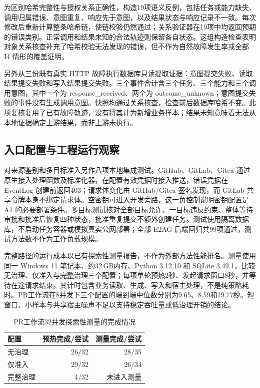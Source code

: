 为区别哈希完整性与授权关系正确性，构造19项语义反例，包括任务或能力缺失、调用归属错误、意图重复、响应先于意图，以及结果状态与响应记录不一致。每次修改后重新计算整条哈希链，使链校验仍然通过；关系验证器在19项中均返回预期的错误类别。正常调用和结果未知的合法轨迹则保留各自状态。这组构造检查表明对象关系核查补充了哈希校验无法发现的错误，但不作为自然故障发生率或全部 I4 情形的覆盖证明。

另外从三份既有真实 HTTP 故障执行数据库只读提取证据：意图提交失败、读取结果提交失败和写入结果提交失败。三个事件合计含三个任务、三个能力和三个调用意图，其中一个为 response\_received、两个为 outcome\_unknown；意图提交失败的事件没有生成调用意图。快照均通过关系核查，检查前后数据库哈希不变。此项复核复用了已有故障轨迹，没有将其计为新增业务样本；结果未知意味着无法从本地证据确定上游结果，而非上游未执行。

\subsection{入口配置与工程运行观察}
\label{sec:engineering-rr022}

对来源鉴别和多目标准入另作八项本地集成测试。GitHub、GitLab、Gitea 通过原生接入处理函数及标准化器，在配置有效凭据时接入推送，错误凭据在 EventLog 创建前返回403；请求体变化由 GitHub/Gitea 签名发现，而 GitLab 共享令牌本身不绑定请求体。空密钥可进入开发旁路，这一负控制说明密钥配置是 A1 的必要部署条件。多目标测试核对全部目标允许、一目标违反约束、整体等待审批和批准后恢复四种状态，批准重复提交不额外创建任务。测试使用隔离数据库，不启动任务容器或模拟真实公网部署；全部 E2AG 后端回归共99项通过，测试方法数不作为工作负载规模。

完整路径的运行成本以已有探索性测量报告，不作为外部方法性能排名。测量使用同一 Windows 11 笔记本、约32\,GB内存、Python 3.12.10 和 SQLite 3.49.1，比较无治理、仅准入与完整治理三个配置；每项单轮预热2秒、发起请求窗口8秒，并等待在途请求结束。其计时包含业务读取、生成、写入和宿主处理，不是纯策略耗时。PR工作流在8并发下三个配置的端到端中位数分别为9.65、8.59和19.77秒。短窗口、小样本与共享宿主噪声不足以支持稳定吞吐量或低治理开销的结论。

\begin{table}[htbp]
\centering
\caption{PR工作流32并发探索性测量的完成情况}
\label{tab:exploratory-rr022}
\small
\begin{tabular}{lrr}
\toprule
配置 & 预热完成/尝试 & 测量完成/尝试 \\
\midrule
无治理 & 26/32 & 28/35 \\
仅准入 & 29/32 & 26/34 \\
完整治理 & 4/32 & 未进入测量 \\
\bottomrule
\end{tabular}
\end{table}

